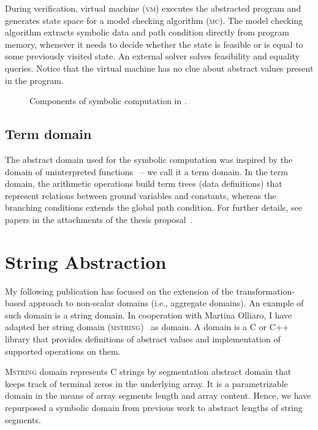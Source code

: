 During verification, virtual machine (\textsc{vm}) executes the abs\-trac\-ted
program and generates state space for a model checking algorithm (\textsc{mc}).
The model checking algorithm extracts symbolic data and path condition directly
from program memory, whenever it needs to decide whether the state is feasible
or is equal to some previously visited state. An external \smt solver solves
feasibility and equality queries. Notice that the virtual machine has no clue
about abstract values present in the program.

\begin{figure}
    \centering
    
    \caption{Components of symbolic computation in \divine.}
    \label{fig:design}
\end{figure}

\subsection{Term domain}

The abstract domain used for the symbolic computation was inspired by the
domain of uninterpreted functions~\cite{Gange2016} -- we call it a term domain.
In the term domain, the arithmetic operations build term trees (data
definitions) that represent relations between ground variables and constants,
whereas the branching conditions extends the global path condition.  For
further details, see papers in the attachments of the thesis
proposal~\cite{Lauko2018SymComp, Lauko2019Sym}.

\section{String Abstraction}
\label{sec:string}

My following publication has focused on the extension of the
transformation-based approach to non-scalar domains (i.e., aggregate domains).
An example of such domain is a string domain. In cooperation with Martina
Olliaro, I have adapted her string domain (\textsc{mstring})~\cite{Olliaro2018}
as \lart domain. A \lart domain is a C or C++ library that provides
definitions of abstract values and implementation of supported operations on
them.

\textsc{Mstring} domain represents C strings by segmentation abstract domain
that keeps track of terminal zeros in the underlying array. It is a
parametrizable domain in the means of array segments length and array
content.  Hence, we have repurposed a symbolic domain from previous work to
abstract lengths of string segments.

